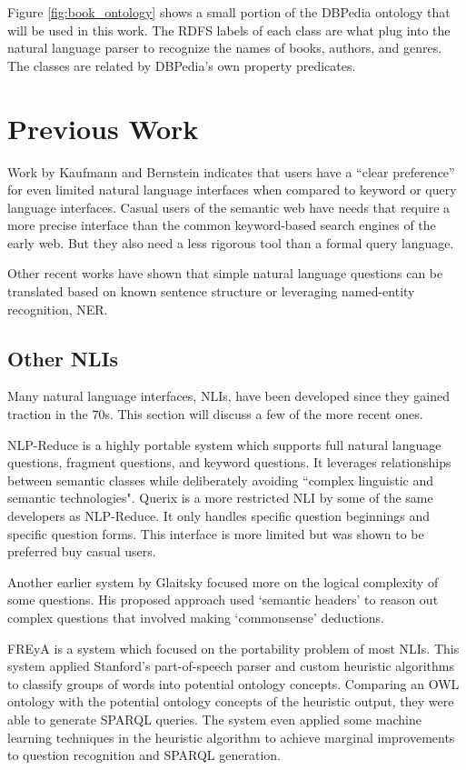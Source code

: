 \documentclass[11pt]{article}
\begin{document}
Figure \ref{fig:book_ontology} shows a small portion of the DBPedia ontology that
will be used in this work. The RDFS labels of each class are what plug into the
natural language parser to recognize the names of books, authors, and genres. 
The classes are related by DBPedia's own property predicates.

\section{Previous Work}

Work by Kaufmann and Bernstein \cite{usability} indicates
that users have a “clear preference” for even limited natural language interfaces
when compared to keyword or query language interfaces.
Casual users of the semantic web have needs that require a more precise interface
than the common keyword-based search engines of the early web. But they also
need a less rigorous tool than a formal query language. \cite{usability}

Other recent works \cite{mapping, freya, galitsky, nlp-reduce, galitsky2, querix}
have shown that simple natural language questions can be translated based
on known sentence structure or leveraging named-entity recognition, NER.

\subsection{Other NLIs}
Many natural language interfaces, NLIs, have been developed since they gained traction
in the 70s\cite{usability}. This section will discuss a few of the more recent ones.

NLP-Reduce\cite{usability,nlp-reduce} is a highly portable system which supports full
natural language questions, fragment questions, and keyword questions.
It leverages relationships between semantic classes while deliberately avoiding
``complex linguistic and semantic technologies"\cite{nlp-reduce}.
Querix\cite{querix} is a more restricted NLI by some of the same developers as
NLP-Reduce. It only handles specific question beginnings and specific question forms. 
This interface is more limited but was shown to be preferred buy casual 
users\cite{usability}.

Another earlier system by Glaitsky\cite{galitsky2} focused more on the logical complexity
of some questions. His proposed approach used `semantic headers' to reason out
complex questions that involved making `commonsense' deductions.

FREyA\cite{freya} is a system which focused on the portability problem of most
NLIs. This system applied Stanford's part-of-speech parser and custom heuristic algorithms
to classify groups of words into potential ontology concepts. Comparing an OWL ontology
with the potential ontology concepts of the heuristic output, they were able to generate
SPARQL queries. The system even applied some machine learning techniques in the 
heuristic algorithm to achieve marginal improvements to question recognition and SPARQL
generation. 
\end{document}
